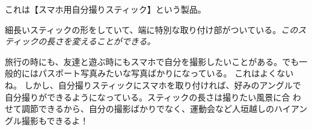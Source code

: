 \documentclass[10pt]{book}
\begin{document}
これは【スマホ用自分撮りスティック】という製品。\\\newline

細長いスティックの形をしていて、端に特別な取り付け部がついている。{\it このスティックの長さを変えることができる。}\\\newline

旅行の時にも、友達と遊ぶ時にもスマホで自分を撮影したいことがある。でも一般的にはパスポート写真みたいな写真ばかりになっている。
これはよくないね。
しかし、自分撮りスティックにスマホを取り付ければ、好みのアングルで自分撮りができるようになっている。スティックの長さは撮りたい風景に合
わせて調節できるから、自分の撮影ばかりでなく、運動会など人垣越しのハイアングル撮影もできるよ！
\end{document}
